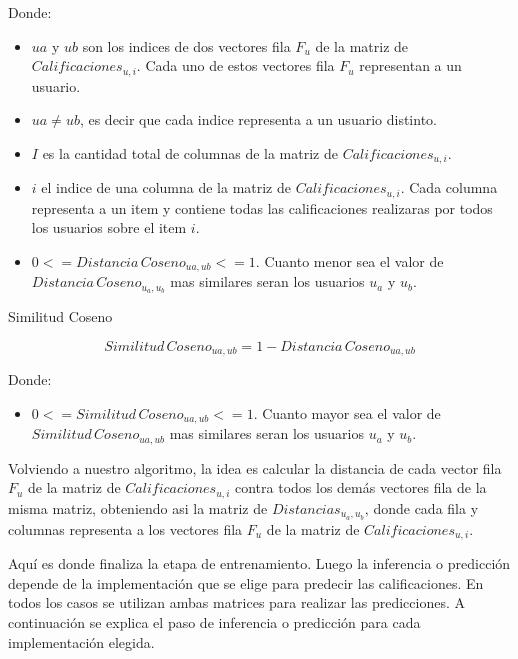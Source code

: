 \documentclass[11pt,a4paper,twoside]{thesis}
\begin{document}
\begin{description}
	\item[Donde:]
\end{description}
\begin{itemize}
	\item $ua$ y $ub$ son los indices de dos vectores fila $F_u$ de la matriz de $Calificaciones_{u,i}$. Cada uno de estos vectores fila $F_u$ representan a un usuario.
 	\item $ua \neq ub$, es decir que cada indice representa a un usuario distinto.
	\item $I$ es la cantidad total de columnas de la matriz de $Calificaciones_{u,i}$.
	\item $i$ el indice de una columna de la matriz de $Calificaciones_{u,i}$. Cada columna representa a un item y contiene todas las calificaciones realizaras por todos los usuarios sobre el item $i$.
	\item $0 <= Distancia \mspace{3mu} Coseno_{ua, ub} <= 1$. Cuanto menor sea el valor de $Distancia \mspace{3mu} Coseno_{u_a, u_b}$ mas similares seran los usuarios $u_a$ y $u_b$.
\end{itemize}

\clearpage
\begin{description}
	\item[Similitud Coseno]
\end{description}
\begin{equation*}
	Similitud \mspace{3mu}Coseno_{ua, ub} = 1- Distancia \mspace{3mu}Coseno_{ua, ub}
\end{equation*}
\begin{description}
	\item[Donde:]
\end{description}
\begin{itemize}
	\item $0 <= Similitud \mspace{3mu}Coseno_{ua, ub} <= 1$. Cuanto mayor sea el valor de $Similitud \mspace{3mu}Coseno_{ua, ub}$ mas similares seran los usuarios $u_a$ y $u_b$.
\end{itemize}


Volviendo a nuestro algoritmo, la idea es calcular la distancia de cada vector fila $F_u$ de la matriz de $Calificaciones_{u,i}$ contra todos 
los demás vectores fila de la misma matriz, obteniendo asi la matriz de $Distancias_{u_a,u_b}$, donde cada fila y columnas representa a los 
vectores fila $F_u$ de la matriz de $Calificaciones_{u,i}$. 

Aquí es donde finaliza la etapa de entrenamiento. Luego la inferencia o predicción depende de la implementación que se elige para predecir 
las calificaciones. En todos los casos se utilizan ambas matrices para realizar las predicciones. A continuación se explica el paso de inferencia o 
predicción para cada implementación elegida.
\end{document}

